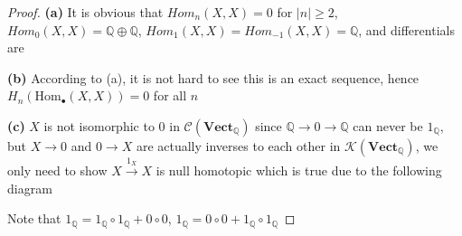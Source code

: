 \documentclass[../main.tex]{subfiles}
\begin{document}
\begin{proof}
\textbf{(a) }It is obvious that $Hom_n(X,X)=0$ for $|n|\geq 2$, $Hom_0(X,X)=\mathbb Q\oplus\mathbb Q$, $Hom_1(X,X)=Hom_{-1}(X,X)=\mathbb Q$, and differentials are
\begin{center}
\end{center}
\textbf{(b) }According to (a), it is not hard to see this is an exact sequence, hence $H_n(\mathrm{Hom}_\bullet(X,X))=0$ for all $n$ \par
\textbf{(c) }$X$ is not isomorphic to $0$ in $\mathscr C(\mathbf{Vect}_\mathbb{Q})$ since $\mathbb Q\to 0\to\mathbb Q$ can never be $1_\mathbb{Q}$, but $X\to0$ and $0\to X$ are actually inverses to each other in $\mathscr K(\mathbf{Vect}_\mathbb{Q})$, we only need to show $X\xrightarrow{1_X} X$ is null homotopic which is true due to the following diagram
\begin{center}
\end{center}
Note that $1_{\mathbb Q}=1_{\mathbb Q}\circ1_{\mathbb Q}+0\circ0$, $1_{\mathbb Q}=0\circ0+1_{\mathbb Q}\circ1_{\mathbb Q}$
\end{proof}
\end{document}
